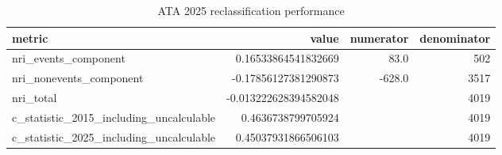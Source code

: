 \begin{table}[htbp]
\centering
\caption{ATA 2025 reclassification performance}
\label{tab:m036\_ata\_performance}
\begin{tabular}{lrrr}
\toprule
metric & value & numerator & denominator \\
\midrule
nri\_events\_component & 0.16533864541832669 & 83.0 & 502 \\
nri\_nonevents\_component & -0.17856127381290873 & -628.0 & 3517 \\
nri\_total & -0.013222628394582048 &  & 4019 \\
c\_statistic\_2015\_including\_uncalculable & 0.4636738799705924 &  & 4019 \\
c\_statistic\_2025\_including\_uncalculable & 0.45037931866506103 &  & 4019 \\
\bottomrule
\end{tabular}
\end{table}
